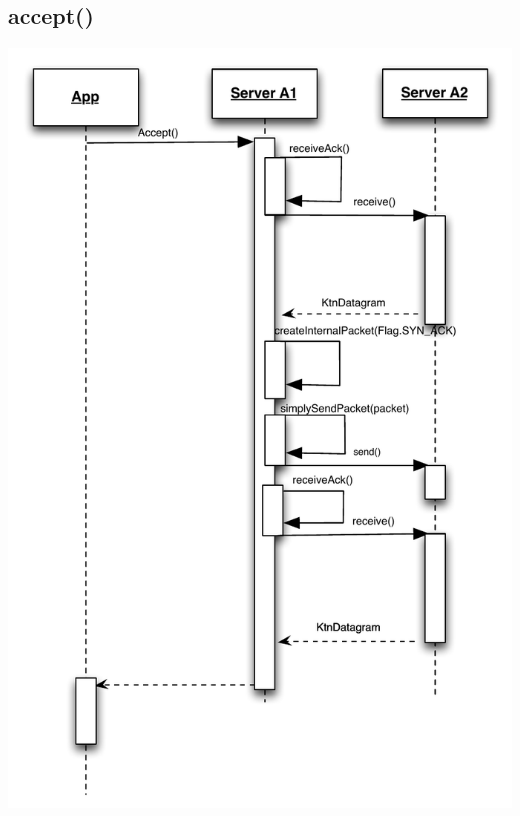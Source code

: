 \documentclass{article}
\begin{document}
\subsection{accept()}
\includegraphics[scale=0.8]{ktnAccept.pdf}
\end{document}
